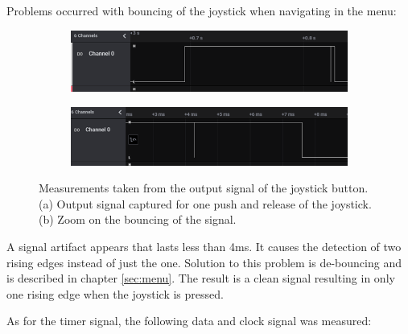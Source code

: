 \documentclass[twocolumn]{article}
\begin{document}
	\newpage
	\vspace*{40px}
	
	Problems occurred with bouncing of the joystick when navigating in the menu:
	
	\begin{figure}[H]
		\centering
		\begin{subfigure}[b]{\columnwidth}
			\centering
			\includegraphics[width=\columnwidth]{debounce1.PNG}
			\caption{}
			\label{subfig3.1}
		\end{subfigure}
		 
		\begin{subfigure}[b]{\columnwidth}
			\centering
			\includegraphics[width=\columnwidth]{debounce2.PNG}
			\caption{}
			\label{subfig3.2}
		\end{subfigure}
		\caption{Measurements taken from the output signal of the joystick button. (a) Output signal captured for one push and release of the joystick. (b) Zoom on the bouncing of the signal.}
		\label{fig3}
	\end{figure}

	A signal artifact appears that lasts less than 4ms. It causes the detection of two rising edges instead of just the one. Solution to this problem is de-bouncing and is described in chapter \ref{sec:menu}. The result is a clean signal resulting in only one rising edge when the joystick is pressed.
	\newline
	
	As for the timer signal, the following data and clock signal was measured:
	
\end{document}

